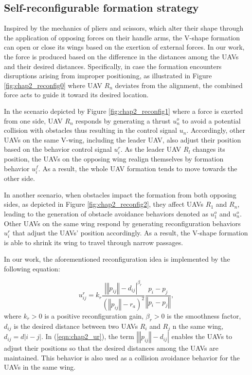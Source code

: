 
\subsection{Self-reconfigurable formation strategy} 
\label{sec:0reconfig}
Inspired by the mechanics of pliers and scissors, which alter their shape through the application of opposing forces on their handle arms, the V-shape formation can open or close its wings based on the exertion of external forces. In our work, the force is produced based on the difference in the distances among the UAVs and their desired distances. Specifically, in case the formation encounters disruptions arising from improper positioning, as illustrated in Figure \ref{fig:chap2_reconfig0} where UAV $R_n$ deviates from the alignment, the combined force acts to guide it toward its desired location.

In the scenario depicted by Figure \ref{fig:chap2_reconfig1} where a force is exerted from one side, UAV $R_n$ responds by generating a thrust $u_n^o$ to avoid a potential collision with obstacles thus resulting in the control signal $u_n$. Accordingly, other UAVs on the same V-wing, including the leader UAV, also adjust their position based on the behavior control signal $u_i^r$. As the leader UAV $R_l$ changes its position, the UAVs on the opposing wing realign themselves by formation behavior $u_i^f$. As a result, the whole UAV formation tends to move towards the other side.

In another scenario, when obstacles impact the formation from both opposing sides, as depicted in Figure \ref{fig:chap2_reconfig2}, they affect UAVs $R_1$ and $R_n$, leading to the generation of obstacle avoidance behaviors denoted as $u_1^o$ and $u_n^o$. Other UAVs on the same wing respond by generating reconfiguration behaviors $u_i^r$ that adjust the UAVs' position accordingly. As a result, the V-shape formation is able to shrink its wing to travel through narrow passages.

In our work, the aforementioned reconfiguration idea is implemented by the following equation:

\begin{equation}
    u_{ij}^{r}=k_{r}\dfrac{\left|\left\Vert p_{ij}\right\Vert -d_{ij}\right|^{\beta_r}}{\left(\left\Vert p_{ij}\right\Vert -r_{a}\right)^{2}}\dfrac{p_i-p_j}{\left\Vert p_i-p_j\right\Vert},
    \label{eqn:chap2_ur}
\end{equation}
where $k_r>0$ is a positive reconfiguration gain, $\beta_r>0$ is the smoothness factor, $d_{ij}$ is the desired distance between two UAVs $R_i$ and $R_j$ n the same wing, $d_{ij}=d\left\vert i-j\right\vert$. In (\ref{eqn:chap2_ur}), the term $\left|\left\Vert p_{ij}\right\Vert -d_{ij}\right|$ enables the UAVs to adjust their positions so that the desired distances among the UAVs are maintained. This behavior is also used as a collision avoidance behavior for the UAVs in the same wing.

